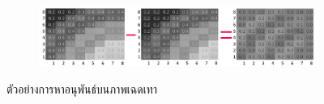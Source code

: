 \begin{figure}[H]
    \centering
    \begin{subfigure}{0.95\linewidth}
        \centering
        \includegraphics[width=0.9\linewidth]{image/finite_difference/x_derivertive.png}
    \end{subfigure}
    \caption{ตัวอย่างการหาอนุพันธ์บนภาพเฉดเทา}
    \label{figure:x-derivertive}
\end{figure}